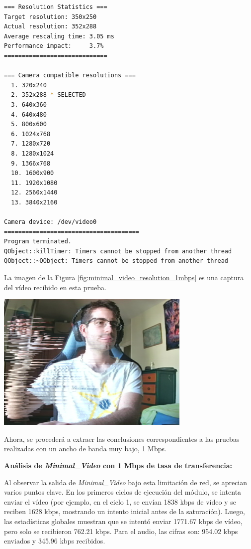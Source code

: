 \begin{lstlisting}[language=bash,basicstyle=\ttfamily\tiny]
=== Resolution Statistics ===
Target resolution: 350x250
Actual resolution: 352x288
Average rescaling time: 3.05 ms
Performance impact:     3.7%
=============================

=== Camera compatible resolutions ===
  1. 320x240
  2. 352x288 * SELECTED
  3. 640x360
  4. 640x480
  5. 800x600
  6. 1024x768
  7. 1280x720
  8. 1280x1024
  9. 1366x768
  10. 1600x900
  11. 1920x1080
  12. 2560x1440
  13. 3840x2160

Camera device: /dev/video0
======================================
Program terminated.
QObject::killTimer: Timers cannot be stopped from another thread
QObject::~QObject: Timers cannot be stopped from another thread
\end{lstlisting}
\vspace{\baselineskip}

\newpage

La imagen de la Figura \ref{fig:minimal_video_resolution_1mbps} es una captura del vídeo recibido en esta prueba.
\begin{center}
  \includegraphics[width = 0.7\textwidth]{images/VideoRecibido1.3.png}
  \label{fig:minimal_video_resolution_1mbps}
\end{center}

\newpage

Ahora, se procederá a extraer las conclusiones correspondientes a las pruebas realizadas con un ancho de banda muy bajo, 1 Mbps.

\vspace{\baselineskip}

\textbf{Análisis de \textit{Minimal\_Video} con 1 Mbps de tasa de transferencia:}
\vspace{\baselineskip}

Al observar la salida de \textit{Minimal\_Video} bajo esta limitación de red, se aprecian varios puntos clave. En los primeros ciclos de ejecución del módulo, se intenta enviar el vídeo (por ejemplo, en el ciclo 1, se envían 1838 kbps de vídeo y se reciben 1628 kbps, mostrando un intento inicial antes de la saturación). Luego, las estadísticas globales muestran que se intentó enviar 1771.67 kbps de vídeo, pero solo se recibieron 762.21 kbps. Para el audio, las cifras son: 954.02 kbps enviados y 345.96 kbps recibidos.
\vspace{\baselineskip}

